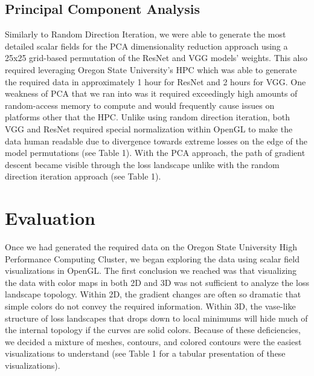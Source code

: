 \documentclass{acmsiggraph}
\begin{document}
\subsection{Principal Component Analysis}

Similarly to Random Direction Iteration, we were able to generate the most detailed scalar fields for the PCA dimensionality reduction approach using a 25x25 grid-based permutation of the ResNet and VGG models' weights. This also required leveraging Oregon State University's HPC which was able to generate the required data in approximately 1 hour for ResNet and 2 hours for VGG. One weakness of PCA that we ran into was it required exceedingly high amounts of random-access memory to compute and would frequently cause issues on platforms other that the HPC. Unlike using random direction iteration, both VGG and ResNet required special normalization within OpenGL to make the data human readable due to divergence towards extreme losses on the edge of the model permutations (see Table 1). With the PCA approach, the path of gradient descent became visible through the loss landscape unlike with the random direction iteration approach (see Table 1).

\section{Evaluation}
\label{sec:intro}

Once we had generated the required data on the Oregon State University High Performance Computing Cluster, we began exploring the data using scalar field visualizations in OpenGL. The first conclusion we reached was that visualizing the data with color maps in both 2D and 3D was not sufficient to analyze the loss landscape topology. Within 2D, the gradient changes are often so dramatic that simple colors do not convey the required information. Within 3D, the vase-like structure of loss landscapes that drops down to local minimums will hide much of the internal topology if the curves are solid colors. Because of these deficiencies, we decided a mixture of meshes, contours, and colored contours were the easiest visualizations to understand (see Table 1 for a tabular presentation of these visualizations). 
\end{document}

